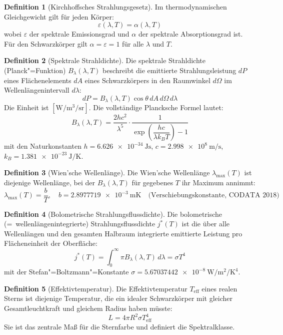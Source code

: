 ﻿\documentclass[a4paper,12pt]{article}
\theoremstyle{definition}
\newtheorem{definition}{Definition}
\begin{document}
\begin{definition}[Kirchhoffsches Strahlungsgesetz]
    Im thermodynamischen Gleichgewicht gilt für jeden Körper:
    \[
        \varepsilon(\lambda, T) = \alpha(\lambda, T)
    \]
    wobei $\varepsilon$ der spektrale Emissionsgrad und $\alpha$ der spektrale
    Absorptionsgrad ist. Für den Schwarzkörper gilt $\alpha = \varepsilon = 1$
    für alle $\lambda$ und $T$.
\end{definition}

\begin{definition}[Spektrale Strahldichte]
    Die spektrale Strahldichte (Planck"=Funktion) $B_\lambda(\lambda, T)$ beschreibt
    die emittierte Strahlungsleistung $dP$ eines Flächenelements $dA$ eines
    Schwarzkörpers in den Raumwinkel $d\Omega$ im Wellenlängenintervall $d\lambda$:
    \[
        dP = B_\lambda(\lambda, T) \cos\theta \, dA \, d\Omega \, d\lambda
    \]
    Die Einheit ist $[\si{\watt\per\metre\cubed\per\steradian}]$. Die vollständige
    Plancksche Formel lautet:
    \[
        B_\lambda(\lambda, T) = \frac{2hc^2}{\lambda^5} \cdot
        \frac{1}{\exp\!\left(\dfrac{hc}{\lambda k_B T}\right) - 1}
    \]
    mit den Naturkonstanten $h = \SI{6.626e-34}{\joule\second}$,
    $c = \SI{2.998e8}{\metre\per\second}$, $k_B = \SI{1.381e-23}{\joule\per\kelvin}$.
\end{definition}

\begin{definition}[Wien'sche Wellenlänge]
    Die Wien'sche Wellenlänge $\lambda_{\max}(T)$ ist diejenige Wellenlänge,
    bei der $B_\lambda(\lambda,T)$ für gegebenes $T$ ihr Maximum annimmt:
    \[
        \lambda_{\max}(T) = \frac{b}{T}, \quad
        b = \SI{2.8977719e-3}{\metre\kelvin}
        \quad \text{(Verschiebungskonstante, CODATA 2018)}
    \]
\end{definition}

\begin{definition}[Bolometrische Strahlungsflussdichte]
    Die bolometrische (=\ wellenlängenintegrierte) Strahlungsflussdichte $j^*(T)$
    ist die über alle Wellenlängen und den gesamten Halbraum integrierte emittierte
    Leistung pro Flächeneinheit der Oberfläche:
    \[
        j^*(T) = \int_0^\infty \pi B_\lambda(\lambda, T) \, d\lambda = \sigma T^4
    \]
    mit der Stefan"=Boltzmann"=Konstante
    $\sigma = \SI{5.67037442e-8}{\watt\per\metre\squared\per\kelvin\tothe{4}}$.
\end{definition}

\begin{definition}[Effektivtemperatur]
    Die Effektivtemperatur $T_{\text{eff}}$ eines realen Sterns ist diejenige Temperatur,
    die ein idealer Schwarzkörper mit gleicher Gesamtleuchtkraft und gleichem Radius
    haben müsste:
    \[
        L = 4\pi R^2 \sigma T_{\text{eff}}^4
    \]
    Sie ist das zentrale Maß für die Sternfarbe und definiert die Spektralklasse.
\end{definition}
\end{document}
